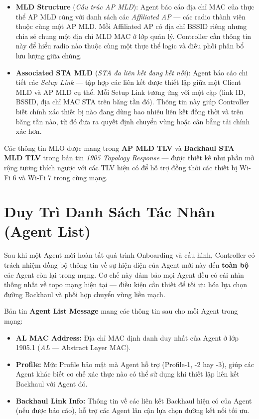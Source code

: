 \begin{itemize}
	\item \textbf{MLD Structure} (\textit{Cấu trúc AP MLD}): Agent báo cáo địa chỉ
	MAC của thực thể AP MLD cùng với danh sách các \textit{Affiliated AP} --- các
	radio thành viên thuộc cùng một AP MLD. Mỗi Affiliated AP có địa chỉ BSSID
	riêng nhưng chia sẻ chung một địa chỉ MLD MAC ở lớp quản lý. Controller cần
	thông tin này để hiểu radio nào thuộc cùng một thực thể logic và điều phối
	phân bổ lưu lượng giữa chúng.
	
	\item \textbf{Associated STA MLD} (\textit{STA đa liên kết đang kết nối}): Agent
	báo cáo chi tiết các \textit{Setup Link} --- tập hợp các liên kết được thiết
	lập giữa một Client MLD và AP MLD cụ thể. Mỗi Setup Link tương ứng với một
	cặp (link ID, BSSID, địa chỉ MAC STA trên băng tần đó). Thông tin này giúp
	Controller biết chính xác thiết bị nào đang dùng bao nhiêu liên kết đồng thời
	và trên băng tần nào, từ đó đưa ra quyết định chuyển vùng hoặc cân bằng tải
	chính xác hơn.
\end{itemize}

Các thông tin MLO được mang trong \textbf{AP MLD TLV} và \textbf{Backhaul STA MLD TLV}
trong bản tin \textit{1905 Topology Response} --- được thiết kế như phần mở rộng tương
thích ngược với các TLV hiện có để hỗ trợ đồng thời các thiết bị Wi-Fi 6 và Wi-Fi 7
trong cùng mạng.


\section{Duy Trì Danh Sách Tác Nhân (Agent List)}

Sau khi một Agent mới hoàn tất quá trình Onboarding và cấu hình, Controller có trách
nhiệm đồng bộ thông tin về sự hiện diện của Agent mới này đến \textbf{toàn bộ} các
Agent còn lại trong mạng. Cơ chế này đảm bảo mọi Agent đều có cái nhìn thống nhất về
topo mạng hiện tại --- điều kiện cần thiết để tối ưu hóa lựa chọn đường Backhaul và
phối hợp chuyển vùng liền mạch.

Bản tin \textbf{Agent List Message} mang các thông tin sau cho mỗi Agent trong mạng:
\begin{itemize}
	\item \textbf{AL MAC Address:} Địa chỉ MAC định danh duy nhất của Agent ở lớp
	1905.1 (\textit{AL} --- Abstract Layer MAC).
	\item \textbf{Profile:} Mức Profile bảo mật mà Agent hỗ trợ (Profile-1, -2 hay -3),
	giúp các Agent khác biết cơ chế xác thực nào có thể sử dụng khi thiết lập
	liên kết Backhaul với Agent đó.
	\item \textbf{Backhaul Link Info:} Thông tin về các liên kết Backhaul hiện có của
	Agent (nếu được báo cáo), hỗ trợ các Agent lân cận lựa chọn đường kết nối
	tối ưu.
\end{itemize}

